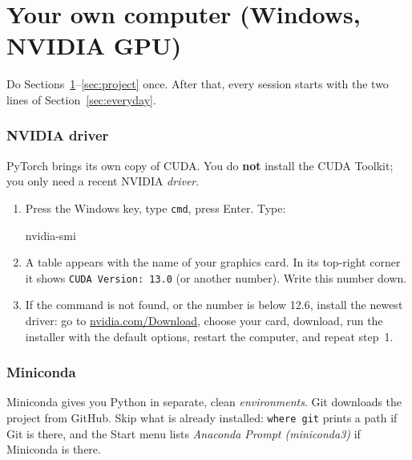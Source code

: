 \documentclass[11pt,a4paper]{article}
\newcommand{\code}[1]{\lstinline{#1}}
\begin{document}
\part{Your own computer (Windows, NVIDIA GPU)}

Do Sections~\ref{sec:driver}--\ref{sec:project} once. After that, every session starts with
the two lines of Section~\ref{sec:everyday}.

\section{NVIDIA driver}\label{sec:driver}

PyTorch brings its own copy of CUDA. You do \textbf{not} install the CUDA Toolkit;
you only need a recent NVIDIA \emph{driver}.

\begin{enumerate}
  \item Press the Windows key, type \code{cmd}, press Enter. Type:
\begin{cmd}
nvidia-smi
\end{cmd}
  \item A table appears with the name of your graphics card. In its top-right corner it shows
        \code{CUDA Version: 13.0} (or another number). Write this number down.
  \item If the command is not found, or the number is below 12.6, install the newest driver:
        go to \href{https://www.nvidia.com/Download/index.aspx}{nvidia.com/Download}, choose your
        card, download, run the installer with the default options, restart the computer, and
        repeat step~1.
\end{enumerate}

\section{Miniconda}\label{sec:conda}

Miniconda gives you Python in separate, clean \emph{environments}. Git downloads the project
from GitHub. Skip what is already installed: \code{where git} prints a path if Git is there,
and the Start menu lists \emph{Anaconda Prompt (miniconda3)} if Miniconda is there.
\end{document}
